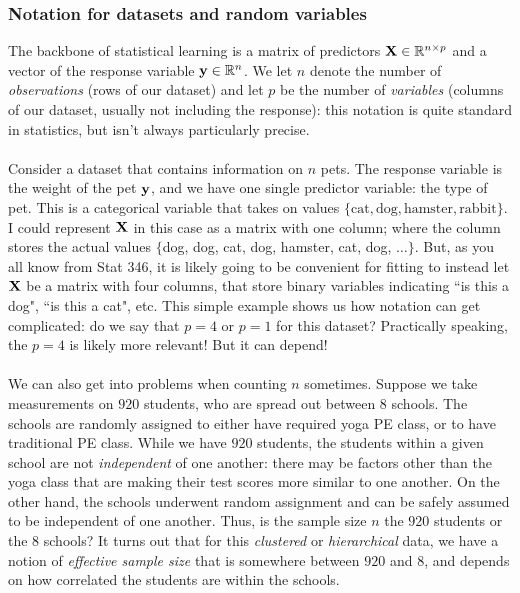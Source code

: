 \documentclass[titlepage,10pt]{scrartcl}
\begin{document}
\subsubsection{Notation for datasets and random variables}

The backbone of statistical learning is a matrix of predictors $\bold{X} \in \mathbb{R}^{n \times p}$ and a vector of the response variable $\bold{y} \in \mathbb{R}^n$. We let $n$ denote the number of \emph{observations} (rows of our dataset) and let $p$ be the number of \emph{variables} (columns of our dataset, usually not including the response): this notation is quite standard in statistics, but isn't always particularly precise. \\
\\
Consider a dataset that contains information on $n$ pets. The response variable is the weight of the pet $\bold{y}$, and we have one single predictor variable: the type of pet. This is a categorical variable that takes on values $\{ \text{cat}, \text{dog}, \text{hamster}, \text{rabbit} \}$. I could represent $\bold{X}$ in this case as a matrix with one column; where the column stores the actual values $\{$dog, dog, cat, dog, hamster, cat, dog, $\ldots \}$.  But, as you all know from Stat 346, it is likely going to be convenient for fitting to instead let $\bold{X}$ be a matrix with four columns, that store binary variables indicating ``is this a dog", ``is this a cat", etc. This simple example shows us how notation can get complicated: do we say that $p=4$ or $p=1$ for this dataset? Practically speaking, the $p=4$ is likely more relevant! But it can depend!  \\
\\
We can also get into problems when counting $n$ sometimes. Suppose we take measurements on $920$ students, who are spread out between $8$ schools. The schools are randomly assigned to either have required yoga PE class, or to have traditional PE class.  While we have $920$ students, the students within a given school are not \emph{independent} of one another: there may be factors other than the yoga class that are making their test scores more similar to one another. On the other hand, the schools underwent random assignment and can be safely assumed to be independent of one another. Thus, is the sample size $n$ the $920$ students or the $8$ schools? It turns out that for this \emph{clustered} or \emph{hierarchical} data, we have a notion of \emph{effective sample size} that is somewhere between $920$ and $8$, and depends on how correlated the students are within the schools. \\
\end{document}
